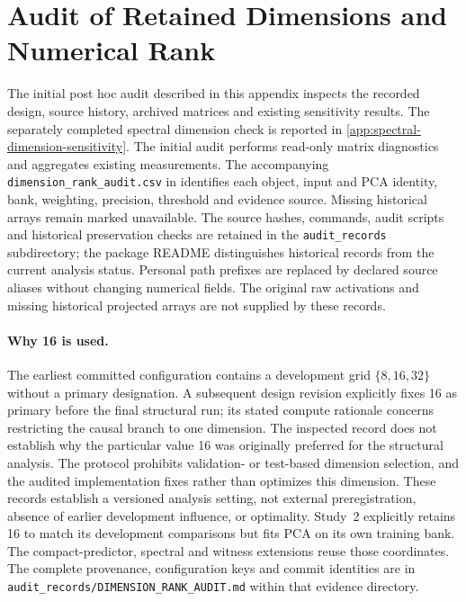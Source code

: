 \section{Audit of Retained Dimensions and Numerical Rank}
\label{app:dimension-rank-audit}
The initial post hoc audit described in this appendix inspects the recorded design, source history, archived matrices and existing sensitivity results. The separately completed spectral dimension check is reported in \cref{app:spectral-dimension-sensitivity}. The initial audit performs read-only matrix diagnostics and aggregates existing measurements. The accompanying \texttt{dimension\_rank\_audit.csv} in  identifies each object, input and PCA identity, bank, weighting, precision, threshold and evidence source. Missing historical arrays remain marked unavailable. The source hashes, commands, audit scripts and historical preservation checks are retained in the \texttt{audit\_records} subdirectory; the package README distinguishes historical records from the current analysis status. Personal path prefixes are replaced by declared source aliases without changing numerical fields. The original raw activations and missing historical projected arrays are not supplied by these records.

\paragraph{Why 16 is used.}
The earliest committed configuration contains a development grid $\{8,16,32\}$ without a primary designation. A subsequent design revision explicitly fixes 16 as primary before the final structural run; its stated compute rationale concerns restricting the causal branch to one dimension. The inspected record does not establish why the particular value 16 was originally preferred for the structural analysis. The protocol prohibits validation- or test-based dimension selection, and the audited implementation fixes rather than optimizes this dimension. These records establish a versioned analysis setting, not external preregistration, absence of earlier development influence, or optimality. Study~2 explicitly retains 16 to match its development comparisons but fits PCA on its own training bank. The compact-predictor, spectral and witness extensions reuse those coordinates. The complete provenance, configuration keys and commit identities are in \texttt{audit\_records/DIMENSION\_RANK\_AUDIT.md} within that evidence directory.


